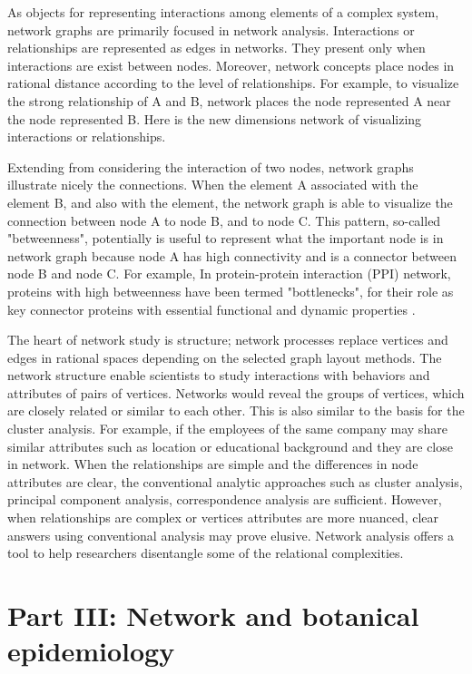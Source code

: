 As objects for representing interactions among elements of a complex system, network graphs are primarily focused in network analysis. Interactions or relationships are represented as edges in networks. They present only when interactions are exist between nodes. Moreover, network concepts place nodes in rational distance according to the level of relationships. For example, to visualize the strong relationship of A and B, network places the node represented A near the node represented B. Here is the new dimensions network of visualizing interactions or relationships.
 
Extending from considering the interaction of two nodes, network graphs illustrate nicely the connections. When the element A associated with the element B, and also with the element, the network graph is able to visualize the connection between node A to node B, and to node C. This pattern, so-called "betweenness", potentially is useful to represent what the important node is in network graph because node A has high connectivity and is a connector between node B and node C. For example, In protein-protein interaction (PPI) network, proteins with high betweenness have been termed "bottlenecks", for their role as key connector proteins with essential functional and dynamic properties .

The heart of network study is structure; network processes replace vertices and edges in rational spaces depending on the selected graph layout methods. The network structure enable scientists to study interactions with behaviors and attributes of pairs of vertices. Networks would reveal the groups of vertices, which are closely related or similar to each other. This is also similar to the basis for the cluster analysis. For example, if the employees of the same company may share similar attributes such as location or educational background and they are close in network. When the relationships are simple and the differences in node attributes are clear, the conventional analytic approaches such as cluster analysis, principal component analysis, correspondence analysis are sufficient. However, when relationships are complex or vertices attributes are more nuanced, clear answers using conventional analysis may prove elusive. Network analysis offers a tool to help researchers disentangle some of the relational complexities.

\section*{Part III: Network and botanical epidemiology}
\label{ch:partthree}

